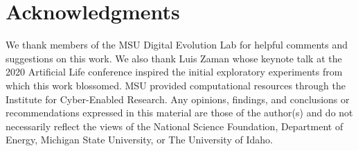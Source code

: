 
\section*{Acknowledgments}


We thank members of the MSU Digital Evolution Lab for helpful comments and suggestions on this work. 
We also thank Luis Zaman whose keynote talk at the 2020 Artificial Life conference inspired the initial exploratory experiments from which this work blossomed. 
MSU provided computational resources through the Institute for Cyber-Enabled Research. 
Any opinions, findings, and conclusions or recommendations expressed in this material are those of the author(s) and do not necessarily reflect the views of the National Science Foundation, Department of Energy, Michigan State University, or The University of Idaho.